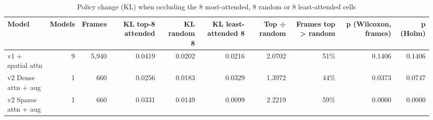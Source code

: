 \begin{table}[t]
\centering
\caption{Policy change (KL) when occluding the 8 most-attended, 8 random or 8 least-attended cells}
\label{tab:occlusion_faithfulness}
\begin{tabular}{lrrrrrrrrr}
\toprule
Model & Models & Frames & KL top-8 attended & KL random 8 & KL least-attended 8 & Top ÷ random & Frames top > random & p (Wilcoxon, frames) & p (Holm) \\
\midrule
v1 + spatial attn & 9 & 5,940 & 0.0419 & 0.0202 & 0.0216 & 2.0702 & 51\% & 0.1406 & 0.1406 \\
v2 Dense attn + aug & 1 & 660 & 0.0256 & 0.0183 & 0.0329 & 1.3972 & 44\% & 0.0373 & 0.0747 \\
v2 Sparse attn + aug & 1 & 660 & 0.0331 & 0.0149 & 0.0099 & 2.2219 & 59\% & 0.0000 & 0.0000 \\
\bottomrule
\end{tabular}
\end{table}
